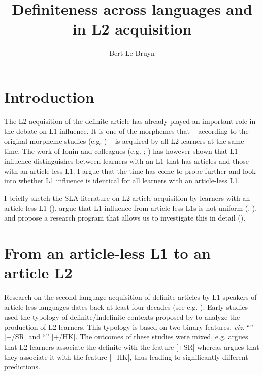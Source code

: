 \documentclass[output=paper,
modfonts
]{langscibook}
\title{Definiteness across languages and in L2 acquisition}
\author{Bert Le Bruyn\affiliation{Utrecht Institute of Linguistics OTS}}
\begin{document}
\maketitle

\section{Introduction}
The L2 acquisition of the definite article has already played an important role in the debate on L1 influence. It is one of the morphemes that -- according to the original morpheme studies (e.g. \citealt{DulayBurt1974}) -- is acquired by all L2 learners at the same time. The work of Ionin and colleagues (e.g. \citealt{IoninKoWexler2004}; \citealt{IoninMontrul2010}) has however shown that L1 influence distinguishes between learners with an L1 that has articles and those with an article-less L1. I argue that the time has come to probe further and look into whether L1 influence is identical for all learners with an article-less L1. 

I briefly sketch the SLA literature on L2 article acquisition by learners with an article-less L1 (), argue that L1 influence from article-less L1s is not uniform \largerpage (, ), and propose a research program that allows us to investigate this in detail ().

\section{From an article-less L1 to an article L2}\label{sec:lebruyn:2}

Research on the second language acquisition of definite articles by L1 speakers of article-less languages dates back at least four decades (see e.g. \citealt{Hakuta1976}). Early studies \citep{Huebner1983,TaroneParrish1988,Thomas1989} used the typology of definite/indefinite contexts proposed by \citet{Bickerton1981} to analyze the production of L2 learners. This typology is based on two binary features, \textit{viz}. ``'' [+\slash\textminus SR] and ``'' [+\slash\textminus HK]. The outcomes of these studies were mixed, e.g. \citet{Thomas1989} argues that L2 learners associate the definite with the feature [+SR] whereas \citet{Master1987} argues that they associate it with the feature [+HK], thus leading to significantly different predictions.
\end{document}
